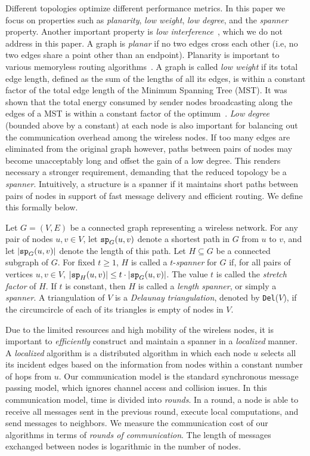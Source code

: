 \documentclass{llncs}
\newcommand{\ssp}{{\tt sp}}
\newcommand{\del}{{\tt Del}}
\begin{document}
Different topologies optimize different performance metrics. In this
paper we focus on properties such as \emph{planarity}, \emph{low weight},
\emph{low degree}, and the \emph{spanner} property.
Another important property is
\emph{low interference}~\cite{BRWZ04,JC05,RSWZ05}, which we do not address
in this paper.
A graph is \emph{planar} if no two edges cross each other (i.e, no two edges
share a point other than an endpoint). Planarity is important to various
memoryless routing algorithms~\cite{KarpKung00,BMSU01}.
A graph is called \emph{low weight} if its total edge length,
defined as the sum of the lengths of all its edges, is within a constant
factor of the total edge length of the Minimum Spanning Tree (MST). It was
shown that the total energy consumed by sender nodes broadcasting along
the edges of a MST is within a constant factor of the
optimum~\cite{MSTBroadcast02}. \emph{Low degree} (bounded above by a constant) at each node is also
important for balancing
out the communication overhead among the wireless nodes. If too many edges are eliminated from the original graph however, paths
between pairs of nodes may become unacceptably long and offset the gain
of a low degree. This renders necessary a stronger requirement,
demanding that the reduced topology be a \emph{spanner}.
Intuitively, a structure is a spanner if it maintains
short paths between pairs of nodes in support of fast message delivery and
efficient routing. We define this formally below.

Let $G = (V, E)$ be a connected graph representing a wireless network.
For any pair of nodes $u,v \in V$, let $\ssp_G(u,v)$ denote a shortest path in $G$ from $u$ to $v$, and let $|\ssp_G(u,v)|$ denote
the length of this path. Let $H \subseteq G$ be a
connected subgraph of $G$. For fixed $t \ge 1$, $H$ is called a
$t$-\emph{spanner} for $G$ if, for all pairs
of vertices $u, v \in V$, $|\ssp_H(u,v)| \le t \cdot |\ssp_G(u,v)|$. The
value $t$ is called the \emph{stretch factor} of $H$. If $t$ is constant,
then $H$ is called a \emph{length spanner}, or simply a \emph{spanner}.
A triangulation of $V$ is a \emph{Delaunay triangulation},
denoted by \del($V$), if the
circumcircle of each of its triangles is empty of nodes in $V$.


Due to the limited resources and high mobility of the wireless nodes, it is
important to \emph{efficiently} construct and maintain a spanner in a \emph{localized} manner.
A \emph{localized} algorithm is a distributed
algorithm in which each node $u$ selects all its incident edges based
on the information from nodes within a constant number of hops from $u$.
Our communication model is the standard synchronous message passing model,
which ignores channel access and collision issues. In this communication model,
time is divided into \emph{rounds}. In a round, a node is able to receive all
messages sent in the previous round, execute local computations, and send messages
to neighbors. We measure the communication cost of our algorithms in terms of
\emph{rounds of communication}. The length of messages exchanged
between nodes is logarithmic in the number of nodes.
\end{document}

